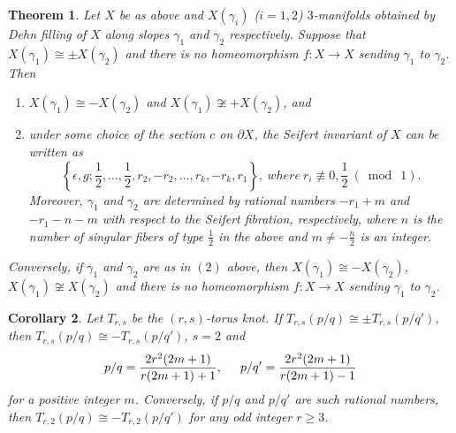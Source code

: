 \documentclass{amsart}
\newtheorem{theorem}{Theorem}[section]
\newtheorem{corollary}[theorem]{Corollary}
\theoremstyle{remark}
\theoremstyle{definition}
\begin{document}
\begin{theorem}{{\cite[Theorem 1]{Rong}}}\label{Rong}
Let $X$ be as above and $X(\gamma_i)$ ($i=1,2$) $3$-manifolds obtained by Dehn filling of $X$ along slopes $\gamma_1$ and $\gamma_2$ respectively. 
Suppose that $X(\gamma_1)\cong \pm X(\gamma_2)$ and there is no homeomorphism $f:X\to X$ sending $\gamma_1$ to $\gamma_2$. 
Then 
\begin{enumerate}
\item 
$X(\gamma_1)\cong -X(\gamma_2)$ and $X(\gamma_1)\not\cong +X(\gamma_2)$, and 
\item 
under some choice of the section $c$ on $\partial X$, the Seifert invariant of $X$ can be 
written as 
$$
\left\{ \epsilon,g; \frac{1}{2}, \ldots, \frac{1}{2},r_2,-r_2,\ldots,r_k,-r_k,r_1 \right\}, 
\ \mathit{where}\ r_i\not\equiv 0,\frac{1}{2}\ (\bmod\ 1). 
$$
Moreover, $\gamma_1$ and $\gamma_2$ are determined by rational numbers $-r_1+m$ and $-r_1-n-m$ with respect to the Seifert fibration, respectively, where $n$ is the number of singular fibers of type $\frac{1}{2}$ in the above and $m\ne -\frac{n}{2}$ is an integer. 
\end{enumerate}
Conversely, if $\gamma_1$ and $\gamma_2$ are as in $(2)$ above, then $X(\gamma_1)\cong -X(\gamma_2)$, $X(\gamma_1)\not\cong X(\gamma_2)$ and there is no homeomorphism $f:X\to X$ sending $\gamma_1$ to $\gamma_2$. 
\end{theorem}

\begin{corollary}\label{corollary:torus-knot}
Let $T_{r,s}$ be the $(r,s)$-torus knot. 
If $T_{r,s}(p/q)\cong \pm T_{r,s}(p/q')$, then $T_{r,s}(p/q)\cong -T_{r,s}(p/q')$, $s=2$ and 
$$
p/q=\frac{2r^2(2m+1)}{r(2m+1)+1}, \hspace{.5cm} 
p/q'=\frac{2r^2(2m+1)}{r(2m+1)-1} 
$$
for a positive integer $m$. 
Conversely, if $p/q$ and $p/q'$ are such rational numbers, then $T_{r,2}(p/q)\cong -T_{r,2}(p/q')$ for any odd integer $r\ge 3$. 
\end{corollary}
\end{document}
